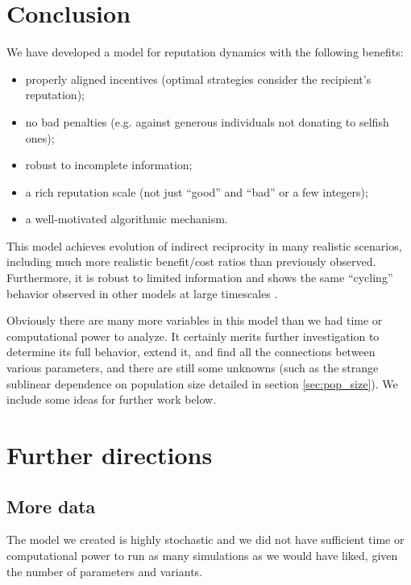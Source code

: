 \documentclass{amsart}
\begin{document}
\section{Conclusion}
\label{sec:conclusion}

We have developed a model for reputation dynamics with the following
benefits:

\begin{itemize}
\item properly aligned incentives (optimal strategies consider the
  recipient's reputation);
\item no bad penalties (e.g. against generous individuals not donating
  to selfish ones);
\item robust to incomplete information;
\item a rich reputation scale (not just ``good'' and ``bad'' or a few
  integers);
\item a well-motivated algorithmic mechanism.
\end{itemize}

This model achieves evolution of indirect reciprocity in many
realistic scenarios, including much more realistic benefit/cost ratios
than previously observed. Furthermore, it is robust to limited
information and shows the same ``cycling'' behavior observed in other
models at large timescales \cite{nowak_evolution_1998}.

Obviously there are many more variables in this model than we had time
or computational power to analyze. It certainly merits further
investigation to determine its full behavior, extend it, and find all
the connections between various parameters, and there are still some
unknowns (such as the strange sublinear dependence on population size
detailed in section \ref{sec:pop_size}). We include some ideas for
further work below.

\section{Further directions}
\label{sec:further}

\subsection{More data}

The model we created is highly stochastic and we did not have
sufficient time or computational power to run as many simulations as
we would have liked, given the number of parameters and variants.
\end{document}
